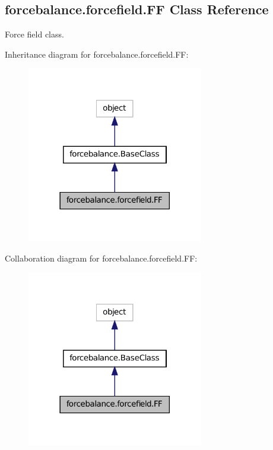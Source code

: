 \hypertarget{classforcebalance_1_1forcefield_1_1FF}{\subsection{forcebalance.\-forcefield.\-F\-F Class Reference}
\label{classforcebalance_1_1forcefield_1_1FF}
}


Force field class.  




Inheritance diagram for forcebalance.\-forcefield.\-F\-F\-:
\nopagebreak
\begin{figure}[H]
\begin{center}
\leavevmode
\includegraphics[width=218pt]{classforcebalance_1_1forcefield_1_1FF__inherit__graph}
\end{center}
\end{figure}


Collaboration diagram for forcebalance.\-forcefield.\-F\-F\-:
\nopagebreak
\begin{figure}[H]
\begin{center}
\leavevmode
\includegraphics[width=218pt]{classforcebalance_1_1forcefield_1_1FF__coll__graph}
\end{center}
\end{figure}
